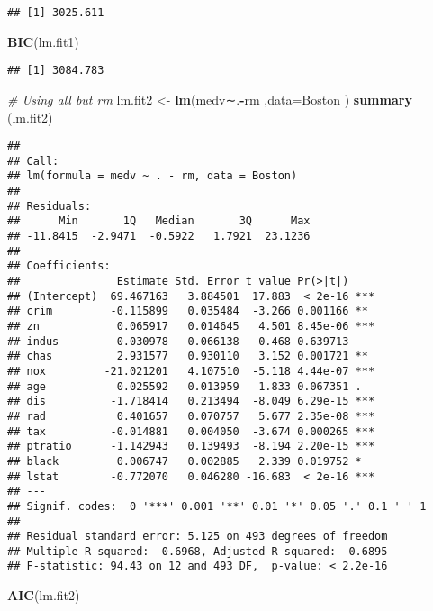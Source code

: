 \documentclass[]{article}
\newenvironment{Shaded}{\begin{snugshade}}{\end{snugshade}}
\newcommand{\CommentTok}[1]{\textcolor[rgb]{0.56,0.35,0.01}{\textit{#1}}}
\newcommand{\DataTypeTok}[1]{\textcolor[rgb]{0.13,0.29,0.53}{#1}}
\newcommand{\KeywordTok}[1]{\textcolor[rgb]{0.13,0.29,0.53}{\textbf{#1}}}
\newcommand{\NormalTok}[1]{#1}
\newcommand{\OperatorTok}[1]{\textcolor[rgb]{0.81,0.36,0.00}{\textbf{#1}}}
\newcommand{\StringTok}[1]{\textcolor[rgb]{0.31,0.60,0.02}{#1}}
\begin{document}
\begin{verbatim}
## [1] 3025.611
\end{verbatim}

\begin{Shaded}
\begin{Highlighting}[]
\KeywordTok{BIC}\NormalTok{(lm.fit1)}
\end{Highlighting}
\end{Shaded}

\begin{verbatim}
## [1] 3084.783
\end{verbatim}

\begin{Shaded}
\begin{Highlighting}[]
\CommentTok{# Using all but rm}
\NormalTok{lm.fit2 <-}\StringTok{ }\KeywordTok{lm}\NormalTok{(medv∼.}\OperatorTok{-}\NormalTok{rm ,}\DataTypeTok{data=}\NormalTok{Boston )}
\KeywordTok{summary}\NormalTok{ (lm.fit2)}
\end{Highlighting}
\end{Shaded}

\begin{verbatim}
## 
## Call:
## lm(formula = medv ~ . - rm, data = Boston)
## 
## Residuals:
##      Min       1Q   Median       3Q      Max 
## -11.8415  -2.9471  -0.5922   1.7921  23.1236 
## 
## Coefficients:
##               Estimate Std. Error t value Pr(>|t|)    
## (Intercept)  69.467163   3.884501  17.883  < 2e-16 ***
## crim         -0.115899   0.035484  -3.266 0.001166 ** 
## zn            0.065917   0.014645   4.501 8.45e-06 ***
## indus        -0.030978   0.066138  -0.468 0.639713    
## chas          2.931577   0.930110   3.152 0.001721 ** 
## nox         -21.021201   4.107510  -5.118 4.44e-07 ***
## age           0.025592   0.013959   1.833 0.067351 .  
## dis          -1.718414   0.213494  -8.049 6.29e-15 ***
## rad           0.401657   0.070757   5.677 2.35e-08 ***
## tax          -0.014881   0.004050  -3.674 0.000265 ***
## ptratio      -1.142943   0.139493  -8.194 2.20e-15 ***
## black         0.006747   0.002885   2.339 0.019752 *  
## lstat        -0.772070   0.046280 -16.683  < 2e-16 ***
## ---
## Signif. codes:  0 '***' 0.001 '**' 0.01 '*' 0.05 '.' 0.1 ' ' 1
## 
## Residual standard error: 5.125 on 493 degrees of freedom
## Multiple R-squared:  0.6968, Adjusted R-squared:  0.6895 
## F-statistic: 94.43 on 12 and 493 DF,  p-value: < 2.2e-16
\end{verbatim}

\begin{Shaded}
\begin{Highlighting}[]
\KeywordTok{AIC}\NormalTok{(lm.fit2)}
\end{Highlighting}
\end{Shaded}
\end{document}
